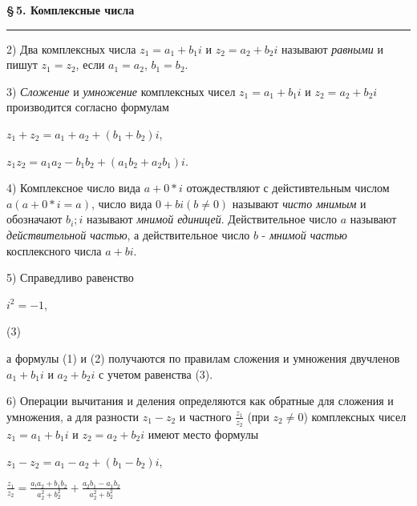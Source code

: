 \documentclass[a5paper, 10pt]{book}
\begin{document}
\newpage
    
\setcounter{page}{37}

    \begin{center}
    \textbf{\S\,5. Комплексные числа}
    \noindent\rule{\textwidth}{1pt}
    \end{center}
      \begin{spacing}
          \par2) Два комплексных числа $z_{1} = a_{1} + b_{1}i$ и $z_{2} = a_{2} + b_{2}i$ называют \textit{равными} и пишут $z_{1} = z_{2}$, если $a_{1} = a_{2}$, $b_{1} = b_{2}$.
          \par 3) \textit{Сложение} и \textit{умножение} комплексных чисел $z_{1} = a_{1} + b_{1}i$ и $z_{2} = a_{2} + b_{2}i$ производится согласно формулам
          \begin{center}
           $z_{1} + z_{2} = a_{1} + a_{2} + (b_{1} + b_{2})i$,
          \par $z_{1}z_{2} = a_{1}a_{2} - b_{1}b_{2} + (a_{1}b_{2} + a_{2}b_{1})i$.
           \end{center}
           \par 4) Комплексное число вида $a + 0*i$ отождествляют с дейстивтельным числом $a (a + 0*i = a)$, число вида $0 + bi (b \neq 0)$ называют \textit{чисто мнимым} и обозначают $b_{i}; i$ называют \textit{мнимой единицей}. Действительное число $a$ называют \textit{действительной частью}, а действительное число $b$ - \textit{мнимой частью} косплексного числа $a + bi$.
           \par 5) Справедливо равенство 
           \begin{center}
               $i^2 = -1$,  \begin{flushright} (3) \end{flushright}     
               \end{center}
           а формулы (1) и (2) получаются по правилам сложения и умножения двучленов $a_{1} + b_{1}i$ и $a_{2} + b_{2}i$ с учетом равенства (3).
           \par 6) Операции вычитания и деления определяются как обратные для сложения и умножения, а для разности $z_{1} - z_{2}$ и частного $\frac{z_{1}}{z_{2}}$ (при $z_{2} \neq 0$) комплексных чисел $z_{1} = a_{1} + b_{1}i$ и $z_{2} = a_{2} + b_{2}i$ имеют место формулы
           \begin{center}
               $z_{1} - z_{2} = a_{1} - a_{2} + (b_{1} - b_{2})i$,
               \par $\frac{z_{1}}{z_{2}} = \frac{a_{!}a_{2} + b_{1}b_{2}}{a^2_{2} + b^2_{2}} + \frac{a_{2}b_{1} - a_{1}b_{2}}{a^2_{2} + b^2_{2}}$

\end{center}
\end{spacing}
\end{document}

